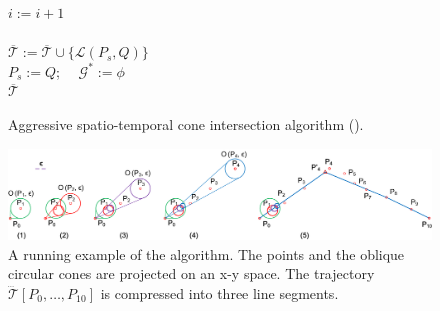 {\begin{figure}[tb!]
\begin{center}
{\begin{minipage}{3.36in}
{	\icc \> \hspace{6ex} $i := i+1$ \\
	\icc \>\hspace{3ex} \Else\\
	\icc \> \hspace{6ex} $\overline{\mathcal{T}} := \overline{\mathcal{T}}\cup \{\mathcal{L}(P_s,Q)\}$ \\
	\icc \> \hspace{6ex} $P_s := Q$;  ~~$\mathcal{G}^* := \phi$ \\
	\icc \hspace{1ex}\Return $\overline{\mathcal{T}}$
%
%
}
\vspace{-2ex}
\myhrule
\end{minipage}
}
\end{center}
\vspace{-2ex}
\caption{\small Aggressive spatio-temporal cone intersection algorithm (\cista).}
\label{alg:ciseda}
\vspace{-2ex}
\end{figure}
}%




\begin{figure}[tb!]
\centering
\includegraphics[scale=0.8]{figures/Fig-conesta.png}
\vspace{-1ex}
\caption{\small A running example of the \cista algorithm. The points and the oblique circular cones are projected on an x-y space. The trajectory $\dddot{\mathcal{T}}[P_0, \ldots, P_{10}]$ is compressed into three line segments.}
\vspace{-2ex}
\label{fig:exm-consta}
\end{figure}



